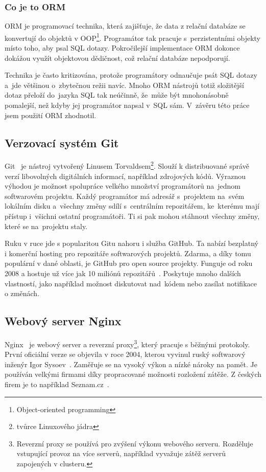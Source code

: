\subsubsection*{Co je to ORM}

ORM je programovací technika, která zajišťuje, že data z relační databáze
se konvertují do objektů v OOP\footnote{Object-oriented programming}. Programátor tak pracuje s~perzistentními
objekty místo toho, aby psal SQL dotazy. Pokročilejší implementace ORM dokonce dokážou využít objektovou dědičnost, což relační databáze nepodporují.

Technika je často kritizována, protože programátory odnaučuje psát SQL dotazy a~jde většinou o~zbytečnou režii navíc.
Mnoho ORM nástrojů totiž složitější dotaz přeloží do~jazyka SQL tak neúčinně,
že~může být mnohonásobně pomalejší, než kdyby jej programátor napsal v~SQL sám.
V~závěru této práce jsem použití ORM zhodnotil.

\subsection{Verzovací systém Git}



Git~\cite{git} je nástroj vytvořený Linusem Torvaldsem\footnote{tvůrce Linuxového jádra}.
Slouží k distribuované správě verzí libovolných digitálních informací, například zdrojových kódů.
Výraznou výhodou je možnost spolupráce velkého množství programátorů na~jednom softwarovém projektu. 
Každý programátor má adresář s~projektem na~svém lokálním disku a~všechny změny sdílí s~centrálním repozitářem,
ke~kterému mají přístup i~všichni ostatní programátoři. Ti si pak mohou stáhnout všechny změny,
které se na~projektu staly.

Ruku v ruce jde s popularitou Gitu nahoru i služba GitHub.
Ta nabízí bezplatný i komerční hosting pro repozitáře softwarových projektů.
Zdarma, a díky tomu populární v dané oblasti, je GitHub pro open source projekty.
Funguje od roku 2008 a hostuje už více jak 10 miliónů repozitářů~\cite{git_about}.
Poskytuje mnoho dalších vlastností, jako například možnost diskutovat nad~kódem
nebo zasílat notifikace o změnách.

\subsection{Webový server Nginx}

Nginx~\cite{nginx} je webový server a reverzní proxy\footnote{Reverzní proxy se používá pro zvýšení výkonu webového serveru.
Rozděluje vstupující provoz na více serverů, například vyvažuje zátěž serverů zapojených v clusteru.}, který pracuje s běžnými protokoly.
První oficiální verze se objevila v roce 2004, kterou vyvinul ruský softwarový inženýr Igor Sysoev~\cite{nginx_changes}.
Zaměřuje se na vysoký výkon a nízké nároky na pamět. Je používán velkými firmami
díky propracované možnosti rozložení zátěže. Z českých firem je to například Seznam.cz~\cite{nginx_seznam}.

